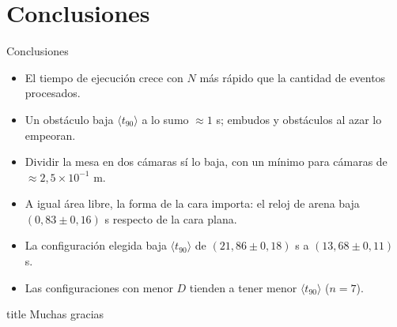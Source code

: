 \documentclass[aspectratio=169]{beamer}
\begin{document}
\section{Conclusiones}

\begin{frame}{Conclusiones}
  \vfill
  \begin{itemize}
    \item El tiempo de ejecución crece con $N$ más rápido que la cantidad de eventos procesados.
    \vspace{0.5em}
    \item Un obstáculo baja $\langle t_{90}\rangle$ a lo sumo $\approx 1$ s; embudos y obstáculos al azar lo empeoran.
    \vspace{0.5em}
    \item Dividir la mesa en dos cámaras sí lo baja, con un mínimo para cámaras de $\approx 2{,}5\times10^{-1}$ m.
    \vspace{0.5em}
    \item A igual área libre, la forma de la cara importa: el reloj de arena baja $(0{,}83 \pm 0{,}16)$ s respecto de la cara plana.
    \vspace{0.5em}
    \item La configuración elegida baja $\langle t_{90}\rangle$ de $(21{,}86 \pm 0{,}18)$ s a $(13{,}68 \pm 0{,}11)$ s.
    \vspace{0.5em}
    \item Las configuraciones con menor $D$ tienden a tener menor $\langle t_{90}\rangle$ ($n = 7$).
  \end{itemize}
  \vfill
\end{frame}

\begin{frame}[plain]
  \vfill
  \begin{beamercolorbox}[sep=8pt,center]{title}
     Muchas gracias
  \end{beamercolorbox}
  \vfill
\end{frame}
\end{document}
